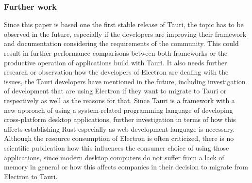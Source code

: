 \subsubsection{Further work}
Since this paper is based one the first stable release of Tauri, the topic has to be observed in the future, especially if the developers are improving their framework and documentation considering the requirements of the community.
This could result in further performance comparisons between both frameworks or the productive operation of applications build with Tauri.
It also needs further research or observation how the developers of Electron are dealing with the issues, the Tauri developers have mentioned in the future, including investigation of development that are using Electron if
they want to migrate to Tauri or respectively as well as the reasons for that.
Since Tauri is a framework with a new approach of using a system-related programming language of developing cross-platform desktop applications, further investigation in terms of how this affects establishing Rust especially as web-development language is necessary.
Although the resource consumption of Electron is often criticized, there is no scientific publication how this influences the consumer choice of using those applications, since modern desktop computers do not suffer from a lack of memory in general
or how this affects companies in their decision to migrate from Electron to Tauri.



